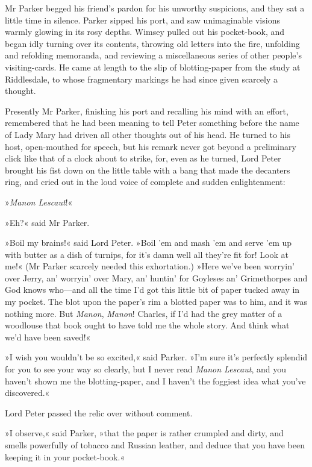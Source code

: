 Mr Parker begged his friend's pardon for his unworthy suspicions, and they sat a little time in silence. Parker sipped his port, and saw unimaginable visions warmly glowing in its rosy depths. Wimsey pulled out his pocket-book, and began idly turning over its contents, throwing old letters into the fire, unfolding and refolding memoranda, and reviewing a miscellaneous series of other people's visiting-cards. He came at length to the slip of blotting-paper from the study at Riddlesdale, to whose fragmentary markings he had since given scarcely a thought.

Presently Mr Parker, finishing his port and recalling his mind with an effort, remembered that he had been meaning to tell Peter something before the name of Lady Mary had driven all other thoughts out of his head. He turned to his host, open-mouthed for speech, but his remark never got beyond a preliminary click like that of a clock about to strike, for, even as he turned, Lord Peter brought his fist down on the little table with a bang that made the decanters ring, and cried out in the loud voice of complete and sudden enlightenment:

»\textit{Manon Lescaut}!«

»Eh?« said Mr Parker.

»Boil my brains!« said Lord Peter. »Boil 'em and mash 'em and serve 'em up with butter as a dish of turnips, for it's damn well all they're fit for! Look at me!« (Mr Parker scarcely needed this exhortation.) »Here we've been worryin' over Jerry, an' worryin' over Mary, an' huntin' for Goyleses an' Grimethorpes and God knows who\allowbreak---\allowbreak and all the time I'd got this little bit of paper tucked away in my pocket. The blot upon the paper's rim a blotted paper was to him, and it was nothing more. But \textit{Manon}, \textit{Manon}! Charles, if I'd had the grey matter of a woodlouse that book ought to have told me the whole story. And think what we'd have been saved!«

»I wish you wouldn't be so excited,« said Parker. »I'm sure it's perfectly splendid for you to see your way so clearly, but I never read \textit{Manon Lescaut}, and you haven't shown me the blotting-paper, and I haven't the foggiest idea what you've discovered.«

Lord Peter passed the relic over without comment.

»I observe,« said Parker, »that the paper is rather crumpled and dirty, and smells powerfully of tobacco and Russian leather, and deduce that you have been keeping it in your pocket-book.«

